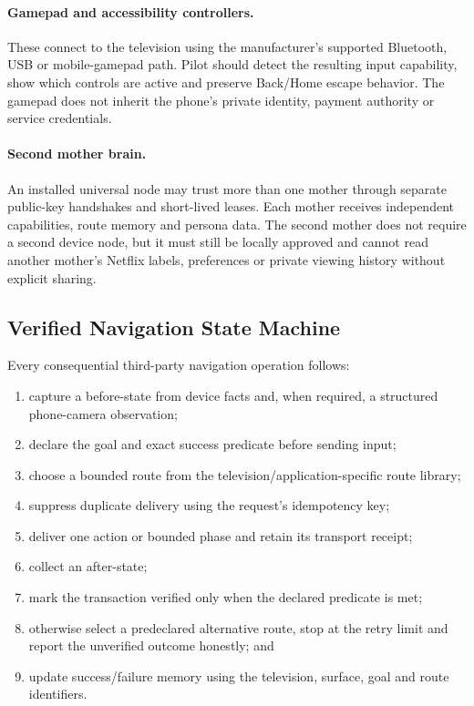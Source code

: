 \paragraph{Gamepad and accessibility controllers.}
These connect to the television using the manufacturer's supported Bluetooth,
USB or mobile-gamepad path. Pilot should detect the resulting input capability,
show which controls are active and preserve Back/Home escape behavior. The
gamepad does not inherit the phone's private identity, payment authority or
service credentials.

\paragraph{Second mother brain.}
An installed universal node may trust more than one mother through separate
public-key handshakes and short-lived leases. Each mother receives independent
capabilities, route memory and persona data. The second mother does not require a
second device node, but it must still be locally approved and cannot read another
mother's Netflix labels, preferences or private viewing history without explicit
sharing.

\subsection{Verified Navigation State Machine}

Every consequential third-party navigation operation follows:

\begin{enumerate}
  \item capture a before-state from device facts and, when required, a structured
        phone-camera observation;
  \item declare the goal and exact success predicate before sending input;
  \item choose a bounded route from the television/application-specific route
        library;
  \item suppress duplicate delivery using the request's idempotency key;
  \item deliver one action or bounded phase and retain its transport receipt;
  \item collect an after-state;
  \item mark the transaction verified only when the declared predicate is met;
  \item otherwise select a predeclared alternative route, stop at the retry limit
        and report the unverified outcome honestly; and
  \item update success/failure memory using the television, surface, goal and
        route identifiers.
\end{enumerate}

